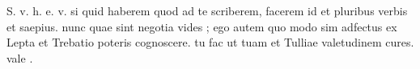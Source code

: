 


S. v. h. e. v. si quid haberem quod ad te scriberem, facerem id et pluribus verbis et saepius. nunc quae sint negotia vides ; ego autem quo modo sim adfectus ex Lepta et Trebatio poteris cognoscere. tu fac ut tuam et Tulliae valetudinem cures. vale .
